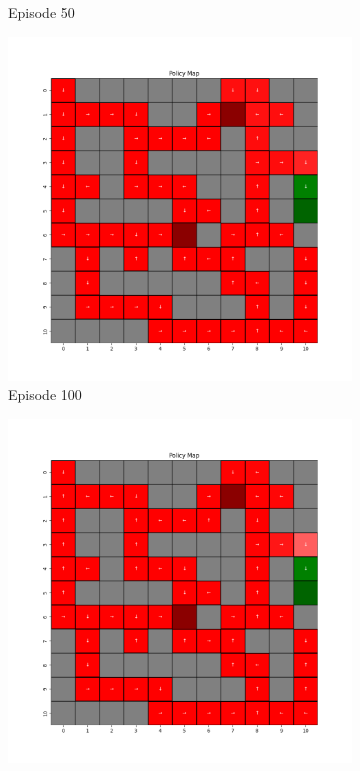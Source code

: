 \documentclass{assignment}
\begin{document}
\begin{figure}[H]
\begin{subfigure}{0.3\textwidth}
    \caption{Episode 50}
    \end{subfigure}\hfill
    \begin{subfigure}{0.3\textwidth}
        \includegraphics[width=\textwidth]{figures/policy_q/gamma_sweep/policy_alpha_0.1_gamma_0.25_epsilon_0.2_iteration_100.png}
    \caption{Episode 100}
    \end{subfigure}
    \begin{subfigure}{0.3\textwidth}
        \includegraphics[width=\textwidth]{figures/policy_q/gamma_sweep/policy_alpha_0.1_gamma_0.25_epsilon_0.2_iteration_1000.png}

\end{subfigure}
\end{figure}
\end{document}
